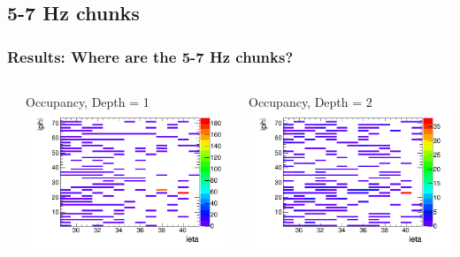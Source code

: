 \documentclass[bigger]{beamer}
\begin{document}
\subsection{5-7 Hz chunks}
\label{sec-3-3}
\begin{frame}
\frametitle{Results: Where are the 5-7 Hz chunks?}
\label{sec-3-3-1}
\begin{columns} %
\label{sec-3-3-1-1}
\begin{column}{0.55\textwidth}
\label{sec-3-3-1-1-1}

\centering
Occupancy, Depth = 1
\includegraphics[width=\textwidth]{fig/occupancy_frequencyOver4_signifOver10_depth1_hist.png}
\end{column}
\begin{column}{0.55\textwidth}
\label{sec-3-3-1-1-2}

\centering
Occupancy, Depth = 2
\includegraphics[width=\textwidth]{fig/occupancy_frequencyOver4_signifOver10_depth2_hist.png}
\end{column}
\end{columns}
\begin{itemize}


\end{itemize}
\end{frame}
\end{document}
